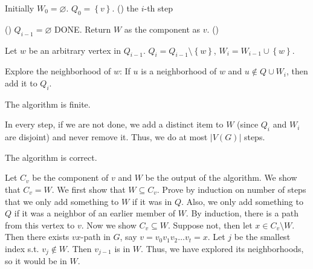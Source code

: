 \begin{algorithm}[H] \label{alg: find component}
    \caption{Find the connected component containing \(v\)}
    \DontPrintSemicolon
    Initially \(W_0 = \varnothing \).
    \(Q_0 = \left\{ v \right\} \).  
    \For() {the \(i\)-th step} {
        \If() {\(Q_{i-1} = \varnothing \)} {
            DONE. Return \(W\) as the component as \(v\).  
        }
        \Else() {
            Let \(w\) be an arbitrary vertex in \(Q_{i-1}\). 
            \(Q_i = Q_{i-1} \setminus \left\{ w \right\} \), \(W_i = W_{i-1} \cup \left\{ w \right\} \). 

            Explore the neighborhood of \(w\): If \(u\) is a neighborhood of \(w\) and \(u \notin Q \cup W_i\), then add it to \(Q_i\).         
        }
    } 
\end{algorithm}

\begin{claim}
    The algorithm is finite.
\end{claim}
\begin{explanation}
    In every step, if we are not done, we add a distinct item to \(W\) (since \(Q_i\) and \(W_i\) are disjoint) and never remove it. Thus, we do at most \(\vert V(G) \vert \) steps.  
\end{explanation}

\begin{claim}
    The algorithm is correct.
\end{claim}

\begin{explanation}
    Let \(C_v\) be the component of \(v\) and \(W\) be the output of the algorithm. We show that \(C_v = W\). We first show that \(W \subseteq C_v\). Prove by induction on number of steps that we only add something to \(W\) if it was in \(Q\). Also, we only add something to \(Q\) if it was a neighbor of an earlier member of \(W\). By induction, there is a path from this vertex to \(v\). Now we show \(C_v \subseteq W\). Suppose not, then let \(x \in C_v \setminus W\). Then there exists \(vx\)-path in \(G\), say \(v = v_0 v_1 v_2 \dots v_t = x \). Let \(j\) be the smallest index s.t. \(v_j \notin W\). Then \(v_{j-1}\) is in \(W\). Thus, we have explored its neighborhoods, so it would be in \(W\).                     
\end{explanation}

